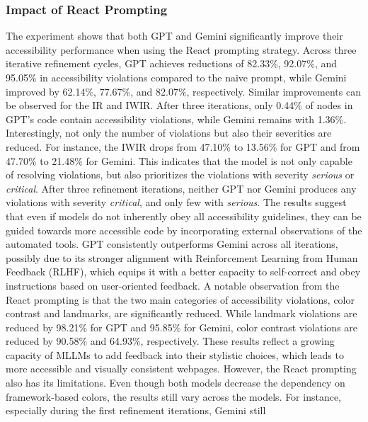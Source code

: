 \subsubsection{Impact of React Prompting}
The experiment shows that both GPT and Gemini significantly 
improve their accessibility performance when using the React 
prompting strategy. Across three iterative refinement 
cycles, GPT achieves reductions of 82.33\%, 92.07\%, and 95.05\% 
in accessibility violations compared to the naive prompt, while 
Gemini improved by 62.14\%, 77.67\%, and 82.07\%, respectively.
Similar improvements can be observed for the IR and IWIR. 
After three iterations, only 0.44\% of nodes in GPT's code
contain accessibility violations, while Gemini remains with 1.36\%.
Interestingly, not only the number of violations but also 
their severities are reduced. For instance, the IWIR drops from 
47.10\% to 13.56\% for GPT and from 47.70\% to 21.48\% for Gemini.
This indicates that the model is not only capable of 
resolving violations, but also prioritizes the violations 
with severity \emph{serious} or \emph{critical}. After three 
refinement iterations, neither GPT nor Gemini produces 
any violations with severity \emph{critical}, and only 
few with \emph{serious}.\newline 
The results suggest that even if models do not inherently 
obey all accessibility guidelines, they can be
guided towards more accessible code by incorporating 
external observations of the automated tools. GPT 
consistently outperforms Gemini across all iterations,
possibly due to its stronger alignment with 
Reinforcement Learning from Human Feedback (RLHF), which 
equips it with a better capacity to self-correct and 
obey instructions based on user-oriented feedback.\newline 
A notable observation from the React prompting is that the 
two main categories of accessibility violations, 
color contrast and landmarks, are significantly reduced.
While landmark violations are reduced by 98.21\% for GPT and
95.85\% for Gemini, color contrast violations are reduced by
90.58\% and 64.93\%, respectively. 
These results reflect a growing capacity of MLLMs 
to add feedback into their stylistic choices, which 
leads to more accessible and visually consistent webpages.\newline 
However, the React prompting also has its limitations.
Even though both 
models decrease the dependency on framework-based 
colors, the results still 
vary across the models. For instance, especially 
during the first refinement iterations, Gemini still 
